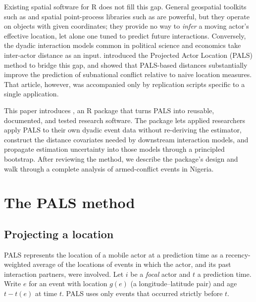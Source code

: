 Existing spatial software for R does not fill this gap. General geospatial
toolkits such as  \citep{sf} and spatial point-process libraries such
as  \citep{spatstat} are powerful, but they operate on objects
with given coordinates; they provide no way to \emph{infer} a moving actor's
effective location, let alone one tuned to predict future interactions.
Conversely, the dyadic interaction models common in political science and
economics take inter-actor distance as an input. \citet{kim2023pals} introduced
the Projected Actor Location (PALS) method to bridge this gap, and showed that
PALS-based distances substantially improve the prediction of subnational conflict
relative to naive location measures. That article, however, was accompanied only
by replication scripts specific to a single application.

This paper introduces , an R package that turns PALS into reusable,
documented, and tested research software. The package lets applied researchers
apply PALS to their own dyadic event data without re-deriving the estimator,
construct the distance covariates needed by downstream interaction models, and
propagate estimation uncertainty into those models through a principled bootstrap.
After reviewing the method, we describe the package's design and walk through a
complete analysis of armed-conflict events in Nigeria.

\section{The PALS method}

\subsection{Projecting a location}

PALS represents the location of a mobile actor at a prediction time as a
recency-weighted average of the locations of events in which the actor, and its
past interaction partners, were involved. Let $i$ be a \emph{focal} actor and $t$
a prediction time. Write $e$ for an event with location $g(e)$ (a
longitude--latitude pair) and age $t - t(e)$ at time $t$. PALS uses only events
that occurred strictly before $t$.

